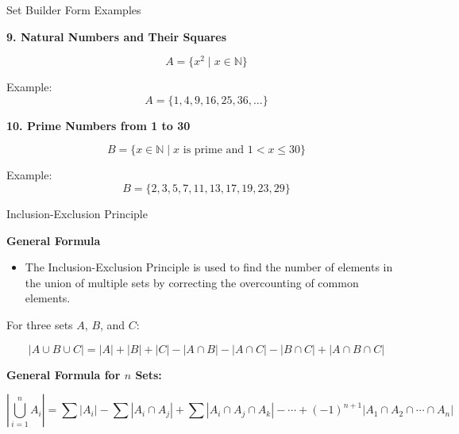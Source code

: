 \documentclass{beamer}
\begin{document}
\begin{frame}{Set Builder Form Examples}

\textbf{9. Natural Numbers and Their Squares}

\[
A=\{x^2\mid x\in\mathbb{N}\}
\]

Example:
\[
A=\{1,4,9,16,25,36,\ldots\}
\]

\vspace{0.4cm}

\textbf{10. Prime Numbers from 1 to 30}

\[
B=\{x\in\mathbb{N}\mid x \text{ is prime and }1<x\leq30\}
\]

Example:
\[
B=\{2,3,5,7,11,13,17,19,23,29\}
\]

\end{frame}

\begin{frame}{Inclusion-Exclusion Principle}

\textbf{General Formula}

\begin{itemize}
    \item The Inclusion-Exclusion Principle is used to find the number of elements in the union of multiple sets by correcting the overcounting of common elements.
\end{itemize}

\vspace{0.3cm}

For three sets \(A\), \(B\), and \(C\):

\[
|A\cup B\cup C| =
|A|+|B|+|C|
-|A\cap B|
-|A\cap C|
-|B\cap C|
+|A\cap B\cap C|
\]

\vspace{0.4cm}

\textbf{General Formula for \(n\) Sets:}

\[
\left|\bigcup_{i=1}^{n} A_i\right|
=
\sum |A_i|
-\sum |A_i\cap A_j|
+\sum |A_i\cap A_j\cap A_k|
-\cdots
+(-1)^{n+1}
\left|A_1\cap A_2\cap\cdots\cap A_n\right|
\]

\end{frame}
\end{document}
